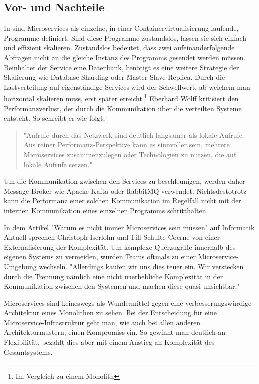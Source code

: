 \subsection{Vor- und Nachteile}
\label{subsec:vorundnachteile}
In  sind Microservices
als einzelne, in einer Containervirtualisierung laufende, Programme definiert. Sind diese Programme
zustandslos, lassen sie sich einfach und effizient skalieren. Zustandslos bedeutet, dass zwei
aufeinanderfolgende Abfragen nicht an die gleiche Instanz des Programms gesendet werden müssen.
Beinhaltet der Service eine Datenbank, benötigt es eine weitere Strategie der Skalierung
wie Database Sharding oder Master-Slave Replica. Durch die Lastverteilung auf eigenständige Services
wird der Schwellwert, ab welchem man horizontal skalieren muss, erst später erreicht.\footnote{Im Vergleich zu einem Monolith}
Eberhard Wolff kritisiert den Performanzverlust, der durch die
Kommunikation über die verteilten Systeme entsteht. So schreibt er wie folgt: 

\begin{quote}
"Aufrufe durch das Netzwerk sind deutlich langsamer als lokale Aufrufe.
Aus reiner Performanz-Perspektive kann es sinnvoller sein, mehrere Microservices
zusammenzulegen oder Technologien zu nutzen, die auf lokale Aufrufe setzen."\cite[S. 65, 3. Absatz]{MicroservicesBook}
\end{quote}

Um die Kommunikation zwischen den Services zu beschleunigen, werden daher Message Broker wie
Apacke Kafta oder RabbitMQ verwendet. Nichtsdestotrotz kann die Performanz einer solchen
Kommunikation im Regelfall nicht mit der internen Kommunikation eines einzelnen Programms schritthalten.

In dem Artikel "Warum es nicht immer Microservices sein müssen" auf Informatik Aktuell
sprechen Christoph Iserlohn und Till Schulte-Coerne von einer Externalisierung der Komplexität.
Um komplexe Querzugriffe innerhalb des eigenen Systems zu vermeiden, würden Teams oftmals 
zu einer Microservice-Umgebung wechseln. "Allerdings kaufen wir uns dies teuer ein.
Wir verstecken durch die Trennung nämlich eine nicht unerhebliche Komplexität in
der Kommunikation zwischen den Systemen und machen diese quasi unsichtbar."\cite[Paragraph 11]{InformatikAktuellWarumNichtImmerMicroservices}

Microservices sind keineswegs als Wundermittel gegen eine verbesserungswürdige Architektur eines
Monolithen zu sehen. Bei der Entscheidung für eine Microservice-Infrastruktur geht man, wie
auch bei allen anderen Architekturmustern, einen Kompromiss ein. So gewinnt man deutlich
an Flexibilität, bezahlt dies aber mit einem Anstieg an Komplexität des Gesamtsystems.

